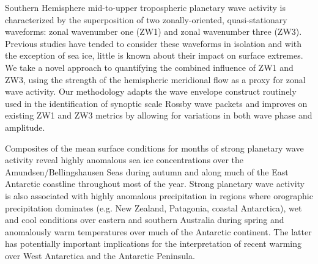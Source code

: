 Southern Hemisphere mid-to-upper tropospheric planetary wave activity is characterized by the superposition of two zonally-oriented, quasi-stationary waveforms: zonal wavenumber one (ZW1) and zonal wavenumber three (ZW3). Previous studies have tended to consider these waveforms in isolation and with the exception of sea ice, little is known about their impact on surface extremes. We take a novel approach to quantifying the combined influence of ZW1 and ZW3, using the strength of the hemispheric meridional flow as a proxy for zonal wave activity. Our methodology adapts the wave envelope construct routinely used in the identification of synoptic scale Rossby wave packets and improves on existing ZW1 and ZW3 metrics by allowing for variations in both wave phase and amplitude.

Composites of the mean surface conditions for months of strong planetary wave activity reveal highly anomalous sea ice concentrations over the Amundsen/Bellingshausen Seas during autumn and along much of the East Antarctic coastline throughout most of the year. Strong planetary wave activity is also associated with highly anomalous precipitation in regions where orographic precipitation dominates (e.g. New Zealand, Patagonia, coastal Antarctica), wet and cool conditions over eastern and southern Australia during spring and anomalously warm temperatures over much of the Antarctic continent. The latter has potentially important implications for the interpretation of recent warming over West Antarctica and the Antarctic Peninsula.
